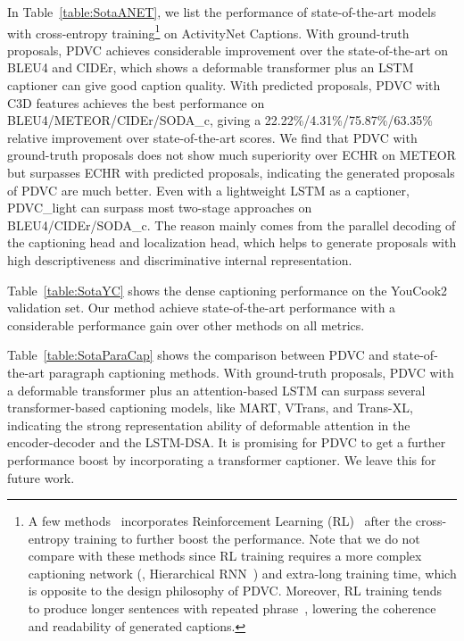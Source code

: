 \vspace{0.5em}
In Table~\ref{table:SotaANET}, we list the performance of state-of-the-art models with cross-entropy training\footnote{{A few methods~\cite{Mun2019stream, wang2020event} incorporates Reinforcement Learning (RL)~\cite{Rennie2017self} after the cross-entropy training to further boost the performance. Note that we do not compare with these methods since RL training requires a more complex captioning network (\eg, Hierarchical RNN~\cite{yu2016video}) and extra-long training time, which is opposite to the design philosophy of PDVC. Moreover, RL training tends to produce longer sentences with repeated phrase~\cite{wang2019describe}, lowering the coherence and readability of generated captions.}}
on ActivityNet Captions. With ground-truth proposals, PDVC achieves considerable improvement over the state-of-the-art on BLEU4 and CIDEr, which shows a deformable transformer plus an LSTM captioner can give good caption quality. With predicted proposals, PDVC with C3D features achieves the best performance on BLEU4/METEOR/CIDEr/SODA\_c, giving a 22.22\%/4.31\%/75.87\%/63.35\% relative improvement over state-of-the-art scores. We find that PDVC with ground-truth proposals does not show much superiority over ECHR on METEOR but surpasses ECHR with predicted proposals, indicating the generated proposals of PDVC are much better.  Even with a lightweight LSTM as a captioner, PDVC\_light can surpass most two-stage approaches on BLEU4/CIDEr/SODA\_c. The reason mainly comes from the parallel decoding of the captioning head and localization head, which helps to generate proposals with high descriptiveness and discriminative internal representation. 


Table~\ref{table:SotaYC} shows the dense captioning performance on the YouCook2 validation set. Our method achieve state-of-the-art performance with a considerable performance gain over other methods on all metrics.

\vspace{0.5em}
Table~\ref{table:SotaParaCap} shows the comparison between PDVC and state-of-the-art paragraph captioning methods. With ground-truth proposals, PDVC with a deformable transformer plus an attention-based LSTM can surpass several transformer-based captioning models, like MART, VTrans, and Trans-XL, indicating the strong representation ability of deformable attention in the encoder-decoder and the LSTM-DSA. It is promising for PDVC to get a further performance boost by incorporating a transformer captioner.  We leave this for future work.

